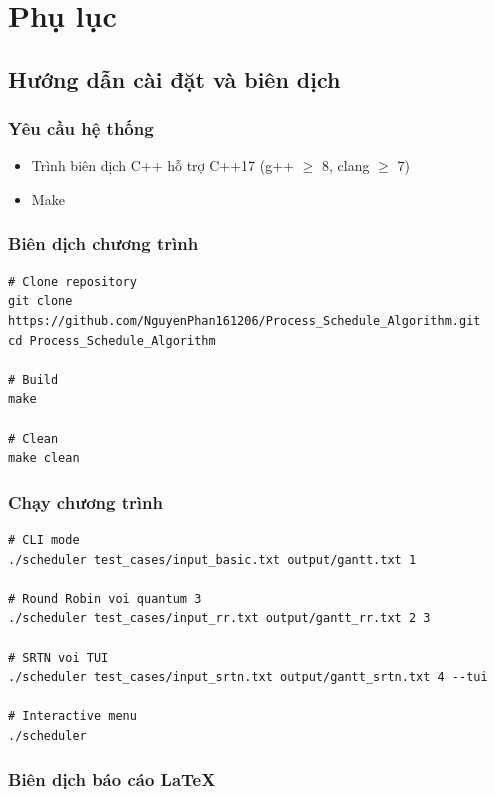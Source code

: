 \chapter{Phụ lục}

\section{Hướng dẫn cài đặt và biên dịch}

\subsection{Yêu cầu hệ thống}

\begin{itemize}
    \item Trình biên dịch C++ hỗ trợ C++17 (g++ $\ge$ 8, clang $\ge$ 7)
    \item Make
\end{itemize}

\subsection{Biên dịch chương trình}

\begin{verbatim}
# Clone repository
git clone https://github.com/NguyenPhan161206/Process_Schedule_Algorithm.git
cd Process_Schedule_Algorithm

# Build
make

# Clean
make clean
\end{verbatim}

\subsection{Chạy chương trình}

\begin{verbatim}
# CLI mode
./scheduler test_cases/input_basic.txt output/gantt.txt 1

# Round Robin voi quantum 3
./scheduler test_cases/input_rr.txt output/gantt_rr.txt 2 3

# SRTN voi TUI
./scheduler test_cases/input_srtn.txt output/gantt_srtn.txt 4 --tui

# Interactive menu
./scheduler
\end{verbatim}

\subsection{Biên dịch báo cáo LaTeX}

